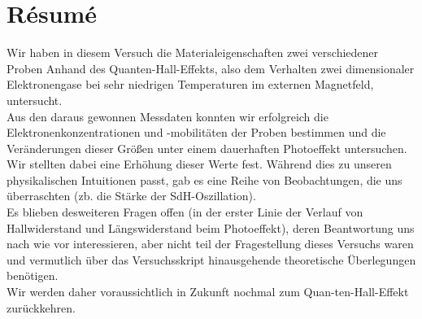 \section{R\'esum\'e}
Wir haben in diesem Versuch die Materialeigenschaften zwei verschiedener Proben Anhand des Quanten-Hall-Effekts, also dem Verhalten zwei dimensionaler Elektronengase bei sehr niedrigen Temperaturen im externen Magnetfeld, untersucht. \\

Aus den daraus gewonnen Messdaten konnten wir erfolgreich die Elektronenkonzentrationen und -mobilitäten der Proben bestimmen und die Veränderungen dieser Größen unter einem dauerhaften Photoeffekt untersuchen. Wir stellten dabei eine Erhöhung dieser Werte fest. 
Während dies zu unseren physikalischen Intuitionen passt, gab es eine Reihe von Beobachtungen, die uns überraschten (zb. die Stärke der SdH-Oszillation). \\

Es blieben desweiteren Fragen offen (in der erster Linie der Verlauf von Hallwiderstand und Längswiderstand beim Photoeffekt), deren Beantwortung uns nach wie vor interessieren, aber nicht teil der Fragestellung dieses Versuchs waren und vermutlich über das Versuchsskript hinausgehende theoretische Überlegungen benötigen.\\

Wir werden daher voraussichtlich in Zukunft nochmal zum Quan-ten-Hall-Effekt zurückkehren. 
